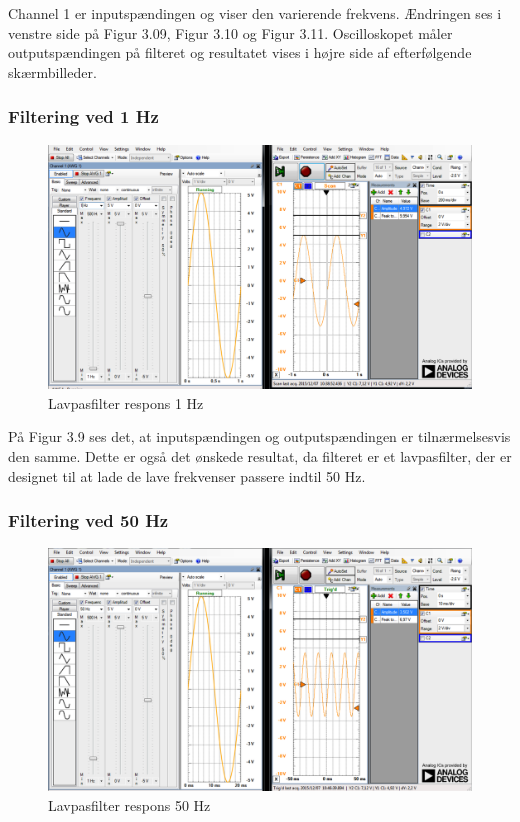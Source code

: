 Channel 1 er inputspændingen og viser den varierende frekvens. Ændringen ses i venstre side på Figur 3.09, Figur 3.10 og Figur 3.11.
Oscilloskopet måler outputspændingen på filteret og resultatet vises i højre side af efterfølgende skærmbilleder.

\subsubsection{Filtering ved 1 Hz}
\begin{figure}[H]
	\centering
	\includegraphics[width=1\textwidth]{Figurer/Snip20151207_39}
	\caption{Lavpasfilter respons 1 Hz}
	\label{fig:Filter}
\end{figure}

På Figur 3.9 ses det, at inputspændingen  og outputspændingen er tilnærmelsesvis den samme. Dette er også det ønskede resultat, da filteret er et lavpasfilter, der er designet til at lade de lave frekvenser passere indtil 50 Hz. 
 
\subsubsection{Filtering ved 50 Hz}
\begin{figure}[H]
	\centering
	\includegraphics[width=1\textwidth]{Figurer/Snip20151207_40}
	\caption{Lavpasfilter respons 50 Hz}
	\label{fig:Filter}
\end{figure}

